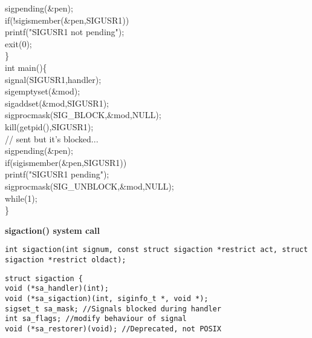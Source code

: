 \begin{flushleft}
\begin{flushleft}
\begin{flushleft}
\begin{flushleft}
{                \halftab sigpending(\&pen);\\
                \halftab if(!sigismember(\&pen,SIGUSR1)) \\
                \tab printf("SIGUSR1 not pending\n");\\
                \halftab exit(0);\\
                \}\\
                int main()\{\\
                \halftab signal(SIGUSR1,handler);\\
                \halftab sigemptyset(\&mod);\\
                \halftab sigaddset(\&mod,SIGUSR1);\\
                \halftab sigprocmask(SIG\_BLOCK,\&mod,NULL);\\
                \halftab kill(getpid(),SIGUSR1);\\ 
                \halftab // sent but it’s blocked...\\
                \halftab sigpending(\&pen); \\
                \halftab if(sigismember(\&pen,SIGUSR1))\\
                \tab printf("SIGUSR1 pending\n");\\
                \halftab sigprocmask(SIG\_UNBLOCK,\&mod,NULL);\\
                \halftab while(1);\\
                \}}  
      \end{flushleft}
    \end{flushleft}
  \end{flushleft}
  \begin{flushleft}
    \textbf{sigaction() system call}\par
    \texttt{int sigaction(int signum, const struct sigaction *restrict act,
            struct sigaction *restrict oldact);} \\
    \begin{flushleft}
      \texttt{struct sigaction \{\\
      \halftab void (*sa\_handler)(int);\\
      \halftab void (*sa\_sigaction)(int, siginfo\_t *, void *);\\
      \halftab sigset\_t sa\_mask; //Signals blocked during handler\\
      \halftab int sa\_flags; //modify behaviour of signal\\
      \halftab void (*sa\_restorer)(void); //Deprecated, not POSIX\\
}
\end{flushleft}
\end{flushleft}
\end{flushleft}
